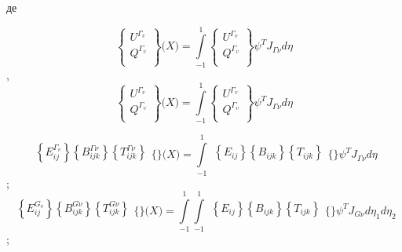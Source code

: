 де

\[{\begin{Bmatrix}
U^{\Gamma_{v}} \\
Q^{\Gamma_{v}} \\
\end{Bmatrix}{(X{) = {\int\limits_{- 1}^{1}\begin{Bmatrix}
U^{\Gamma_{v}} \\
Q^{\Gamma_{v}} \\
\end{Bmatrix}}}}\psi^{T}J_{\mathit{\Gamma\nu}}\mathit{d\eta}}{}\],
\[{\begin{Bmatrix}
U^{\Gamma_{v}} \\
Q^{\Gamma_{v}} \\
\end{Bmatrix}{(X{) = {\int\limits_{- 1}^{1}\begin{Bmatrix}
U^{\Gamma_{v}} \\
Q^{\Gamma_{v}} \\
\end{Bmatrix}}}}\psi^{T}J_{\mathit{\Gamma\nu}}\mathit{d\eta}}{}\]

\[{\begin{matrix}
{\left\{ E_{\mathit{\text{ij}}}^{\Gamma_{v}} \right\}\left\{ B_{\mathit{\text{ijk}}}^{\mathit{\Gamma\nu}} \right\}\left\{ T_{\mathit{\text{ijk}}}^{\mathit{\Gamma\nu}} \right\}} \\
\end{matrix}{\{\}}(X{) = {\int\limits_{- 1}^{1}{\begin{matrix}
{\left\{ E_{\mathit{\text{ij}}} \right\}\left\{ B_{\mathit{\text{ijk}}} \right\}\left\{ T_{\mathit{\text{ijk}}} \right\}} \\
\end{matrix}{\{\}}}}}\psi^{T}J_{\mathit{\Gamma\nu}}\mathit{d\eta}}{}\];\[{\begin{matrix}
{\left\{ E_{\mathit{\text{ij}}}^{G_{v}} \right\}\left\{ B_{\mathit{\text{ijk}}}^{\mathit{G\nu}} \right\}\left\{ T_{\mathit{\text{ijk}}}^{\mathit{G\nu}} \right\}} \\
\end{matrix}{\{\}}(X{) = {\int\limits_{- 1}^{1}{{\int\limits_{- 1}^{1}{\begin{matrix}
{\left\{ E_{\mathit{\text{ij}}} \right\}\left\{ B_{\mathit{\text{ijk}}} \right\}\left\{ T_{\mathit{\text{ijk}}} \right\}} \\
\end{matrix}{\{\}}}}\psi^{T}J_{\mathit{G\nu}}\mathit{d\eta}_{1}\mathit{d\eta}_{2}}}}}{}\];

